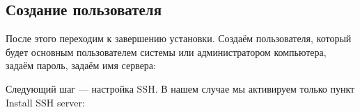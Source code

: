 \documentclass[14pt, a4paper]{article}
\begin{document}
\subsection*{Создание пользователя}
После этого переходим к завершению установки. Создаём пользователя, который
будет основным пользователем системы или администратором компьютера, задаём пароль,
задаём имя сервера:
\begin{figure}[H]%
    \centering
    \label{1.12} %
\end{figure}
Следующий шаг — настройка SSH. В нашем случае мы активируем только пункт Install SSH
server:
\begin{figure}[H]%
    \centering
    \label{1.13} %
\end{figure}
\end{document}
